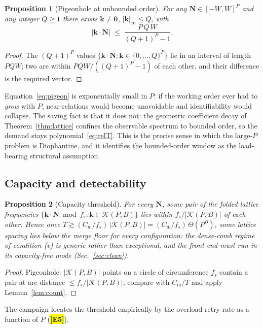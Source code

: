 \documentclass[twocolumn,preprintnumbers,amsmath,amssymb,pra,floatfix]{revtex4-2}
\newcommand{\vect}[1]{\bm{#1}}
\newtheorem{proposition}{Proposition}
\newcommand{\PH}[1]{\colorbox{yellow}{\textbf{\small [#1]}}}
\begin{document}
\begin{proposition}[Pigeonhole at unbounded order]
\label{prop:pigeon}
For any $\vect{N}\in[-W,W]^{P}$ and any integer $Q\ge1$ there exists
$\vect{k}\ne\vect{0}$, $|\vect{k}|_{\infty}\le Q$, with
\begin{equation}
  |\vect{k}\cdot\vect{N}| \;\le\; \frac{P\,Q\,W}{(Q+1)^{P}-1}.
  \label{eq:pigeon}
\end{equation}
\end{proposition}
\begin{proof}
The $(Q+1)^{P}$ values $\{\vect{k}\cdot\vect{N}:\vect{k}\in
\{0,\dots,Q\}^{P}\}$ lie in an interval of length $PQW$; two are
within $PQW/((Q+1)^{P}-1)$ of each other, and their difference is the
required vector.
\end{proof}

Equation~\eqref{eq:pigeon} is exponentially small in $P$: if the
working order ever had to \emph{grow} with $P$, near-relations would
become unavoidable and identifiability would collapse.  The saving
fact is that it does not: the geometric coefficient decay of
Theorem~\ref{thm:lattice} confines the observable spectrum to bounded
order, so the demand stays polynomial~\eqref{eq:relT}.  This is the
precise sense in which the large-$P$ problem is Diophantine, and it
identifies the bounded-order window as the load-bearing structural
assumption.

\subsection{Capacity and detectability}

\begin{proposition}[Capacity threshold]
\label{prop:capscale}
For every $\vect{N}$, some pair of the folded lattice frequencies
$\{\vect{k}\cdot\vect{N}\bmod f_{s}:\vect{k}\in\mathcal{K}(P,B)\}$
lies within $f_{s}/|\mathcal{K}(P,B)|$ of each other.  Hence once
$T\gtrsim(C_{\mathrm{m}}/f_{s})\,|\mathcal{K}(P,B)|
=(C_{\mathrm{m}}/f_{s})\,\Theta(P^{B})$, some lattice spacing lies
below the merge floor for \emph{every} configuration: the dense-comb
regime of condition (v) is generic rather than exceptional, and the
front end must run in its capacity-free mode (Sec.~\ref{sec:clean}).
\end{proposition}
\begin{proof}
Pigeonhole: $|\mathcal{K}(P,B)|$ points on a circle of circumference
$f_{s}$ contain a pair at arc distance
$\le f_{s}/|\mathcal{K}(P,B)|$; compare with $C_{\mathrm{m}}/T$ and
apply Lemma~\ref{lem:count}.
\end{proof}
The campaign locates the threshold empirically by the overload-retry
rate as a function of $P$ (\PH{E5}).
\end{document}
